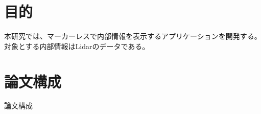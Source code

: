 \section{目的}

本研究では、マーカーレスで内部情報を表示するアプリケーションを開発する。
対象とする内部情報はLidarのデータである。


\section{論文構成}

論文構成

%
